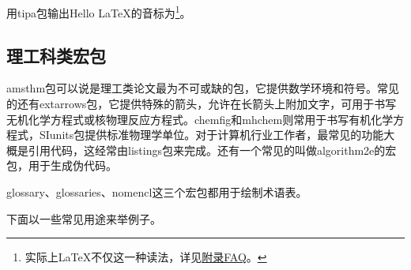 用tipa包输出Hello \LaTeX 的音标为\footnote{实际上\LaTeX 不仅这一种读法，详见\hyperref[FAQ]{附录FAQ}。}。

\subsection{理工科类宏包}

amsthm包可以说是理工类论文最为不可或缺的包，它提供数学环境和符号。常见的还有extarrows包，它提供特殊的箭头，允许在长箭头上附加文字，可用于书写无机化学方程式或核物理反应方程式。chemfig和mhchem则常用于书写有机化学方程式，SIunits包提供标准物理学单位。对于计算机行业工作者，最常见的功能大概是引用代码，这经常由listings包来完成。还有一个常见的叫做algorithm2e的宏包，用于生成伪代码。

glossary、glossaries、nomencl这三个宏包都用于绘制术语表。

下面以一些常见用途来举例子。

